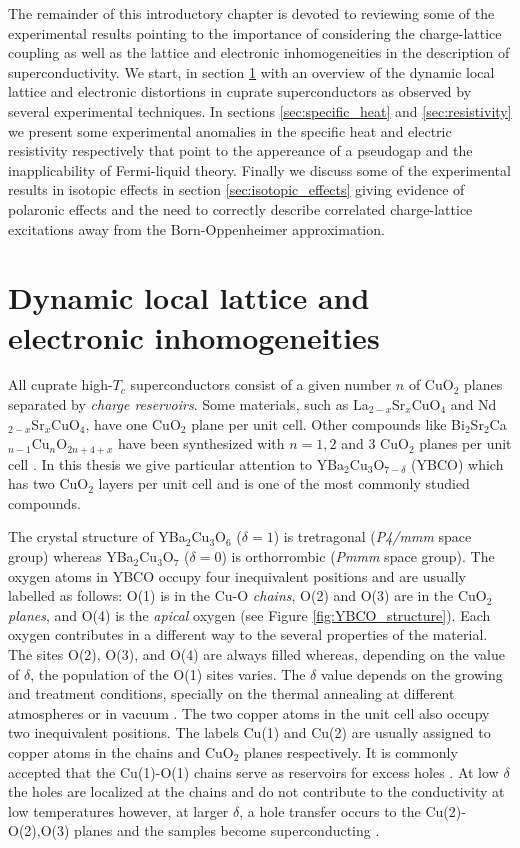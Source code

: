 The remainder of this introductory chapter is devoted to reviewing some of the experimental results pointing to the importance of considering the charge-lattice coupling as well as the lattice and electronic inhomogeneities in the description of superconductivity. 
We start, in section \ref{sec:dynamicDistortions} with an overview of the dynamic local lattice and electronic distortions in cuprate superconductors as observed by several experimental techniques. 
In sections \ref{sec:specific_heat} and \ref{sec:resistivity} we present some experimental anomalies in the specific heat and electric resistivity respectively that point to the appereance of a pseudogap and the inapplicability of Fermi-liquid theory.
Finally we discuss some of the experimental results in isotopic effects in section \ref{sec:isotopic_effects} giving evidence of polaronic effects and the need to correctly describe correlated charge-lattice excitations away from the Born-Oppenheimer approximation.


\section{Dynamic local lattice and electronic inhomogeneities}
\label{sec:dynamicDistortions}

All cuprate high-$T_c$ superconductors consist of a given number $n$ of CuO$_2$ planes separated by \textit{charge reservoirs}.
Some materials, such as La$_{2-x}$Sr$_x$CuO$_4$ and Nd$_{2-x}$Sr$_x$CuO$_4$, have one CuO$_2$ plane per unit cell. 
Other compounds like Bi$_2$Sr$_2$Ca$_{n-1}$Cu$_n$O$_{2n+4+x}$ have been synthesized with $n=1,2$ and 3 CuO$_2$ planes per unit cell \cite{Basov2005}.
In this thesis we give particular attention to YBa$_2$Cu$_3$O$_{7-\delta}$ (YBCO) which has two CuO$_2$ layers per unit cell and is one of the most commonly studied compounds.

The crystal structure of YBa$_2$Cu$_3$O$_6$ ($\delta=1$) is tretragonal (\textit{P4/mmm} space group) whereas YBa$_2$Cu$_3$O$_7$ ($\delta=0$) is orthorrombic (\textit{Pmmm} space group).
The oxygen atoms in YBCO occupy four inequivalent positions and are usually labelled as follows: O(1) is in the Cu-O \textit{chains}, O(2) and O(3) are in the CuO$_2$ \textit{planes}, and O(4) is the \textit{apical} oxygen (see Figure \ref{fig:YBCO_structure}).
Each oxygen contributes in a different way to the several properties of the material.
The sites O(2), O(3), and O(4) are always filled whereas, depending on the value of $\delta$, the population of the O(1) sites varies.
The $\delta$ value depends on the growing and treatment conditions, specially on the thermal annealing at different atmospheres or in vacuum \cite{Ivanov1995}.
The two copper atoms in the unit cell also occupy two inequivalent positions.
The labels Cu(1) and Cu(2) are usually assigned to copper atoms in the chains and CuO$_2$ planes respectively.
It is commonly accepted that the Cu(1)-O(1) chains serve as reservoirs for excess holes \cite{Pickett1989}. 
At low $\delta$ the holes are localized at the chains and do not contribute to the conductivity at low temperatures however, at larger $\delta$, a hole transfer occurs to the Cu(2)-O(2),O(3) planes and the samples become superconducting \cite{Cava1988}.

